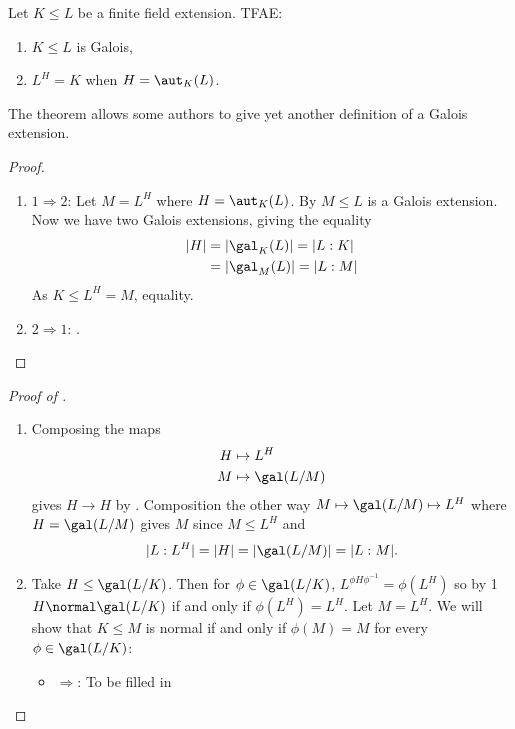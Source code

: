 \documentclass[a4paper]{article}
\begin{document}
\begin{theorem}
  Let \(K \leq L\) be a finite field extension. TFAE:
  \begin{enumerate}
  \item \(K \leq L\) is Galois,
  \item \(L^H = K\) when \(H = \aut_K(L)\).
  \end{enumerate}
\end{theorem}

\begin{remark}
  The theorem allows some authors to give yet another definition of a Galois extension.
\end{remark}

\begin{proof}\leavevmode
  \begin{enumerate}
  \item \(1 \Rightarrow 2\): Let \(M = L^H\) where \(H = \aut_K(L)\). By  \(M \leq L\) is a Galois extension. Now we have two Galois extensions, giving the equality
    \begin{align*}
      |H| &= |\gal_K(L)| = |L:K| \\
          &= |\gal_M(L)| = |L:M|
    \end{align*}
    As \(K \leq L^H = M\), equality.
  \item \(2 \Rightarrow 1\): .
  \end{enumerate}
\end{proof}

\begin{proof}[Proof of ]\leavevmode
  \begin{enumerate}
  \item Composing the maps
    \begin{align*}
      H &\mapsto L^H \\
      M &\mapsto \gal(L/M)
    \end{align*}
    gives \(H \to H\) by . Composition the other way \(M \mapsto \gal(L/M) \mapsto L^H\) where \(H = \gal(L/M)\) gives \(M\) since \(M \leq L^H\) and
    \[
      |L:L^H| = |H| = |\gal(L/M)| = |L:M|.
    \]
  \item Take \(H \leq \gal(L/K)\). Then for \(\phi \in \gal(L/K)\), \(L^{\phi H \phi^{-1}} = \phi(L^H)\) so by 1 \(H \normal \gal(L/K)\) if and only if \(\phi(L^H) = L^H\). Let \(M = L^H\). We will show that \(K \leq M\) is normal if and only if \(\phi(M) = M\) for every \(\phi \in \gal(L/K)\):
    \begin{itemize}
    \item \(\Rightarrow\): To be filled in
    \end{itemize}

  \end{enumerate}
\end{proof}
\end{document}
